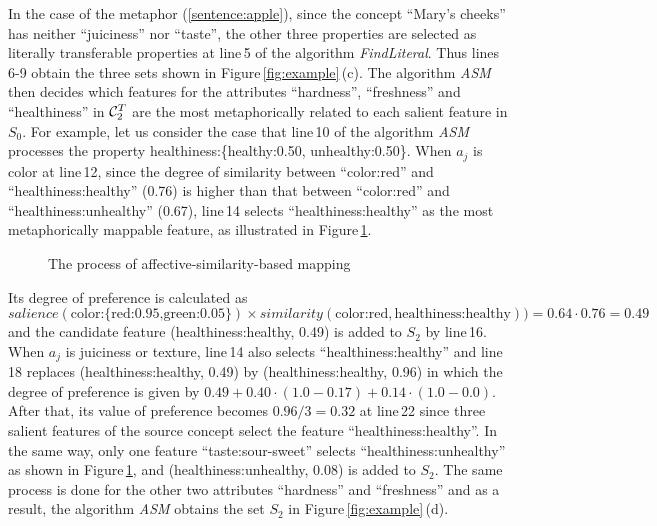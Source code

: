 In the case of the metaphor (\ref{sentence:apple}), 
since the concept ``Mary's cheeks'' has neither ``juiciness'' nor ``taste'', 
the other three properties are selected as literally transferable properties 
at line\,5 of the algorithm {\it FindLiteral}.
Thus lines\,6-9 obtain the three sets shown in Figure\,\ref{fig:example}\,(c).
The algorithm {\it ASM\/} then
decides which features for the attributes ``hardness'',
``freshness'' and ``healthiness'' in ${\cal C}^T_2$ 
are the most metaphorically related to each salient feature in $S_0$. 
For example, let us consider the case that line\,10 of the algorithm {\it ASM\/}
processes the property healthiness:\{healthy:0.50, unhealthy:0.50\}.
When $a_j$ is color at line\,12, since the degree of similarity between ``color:red'' 
and ``healthiness:healthy'' (0.76) is higher than that between 
``color:red'' and ``healthiness:unhealthy'' (0.67), 
line\,14 selects ``healthiness:healthy''
as the most metaphorically mappable feature, as illustrated in Figure\,\ref{fig:ASM}.
\begin{figure}[t]
  \begin{center}
    \makeatletter\ifDS@epsbox
    \else
    \mbox{}
    \fi\makeatother
  \end{center}
  \caption{The process of affective-similarity-based mapping}
  \label{fig:ASM}
\end{figure}
Its degree of preference is calculated as 
$salience(\mbox{color:\{red:0.95,green:0.05\}}) \times similarity(\mbox{color:red},
\mbox{healthiness:healthy})) = 0.64 \cdot 0.76 = 0.49$
and the candidate feature (healthiness:healthy, 0.49) is added to $S_2$ by line\,16.
When $a_j$ is juiciness or texture, line\,14 also selects ``healthiness:healthy'' and 
line\,18 replaces (healthiness:healthy, 0.49) by (healthiness:healthy, 0.96)
in which the degree of preference is given by $0.49+0.40\cdot(1.0-0.17)+0.14\cdot(1.0-0.0)$.
After that, its value of preference becomes $0.96/3=0.32$ at line\,22
since three salient features of the source concept select
the feature ``healthiness:healthy''.
In the same way, only one feature ``taste:sour-sweet'' selects ``healthiness:unhealthy'' 
as shown in Figure\,\ref{fig:ASM}, and (healthiness:unhealthy, 0.08) is added to $S_2$.
The same process is done for the other two attributes ``hardness'' and ``freshness''
and as a result, the algorithm {\it ASM\/} obtains the set $S_2$ 
in Figure\,\ref{fig:example}\,(d).

